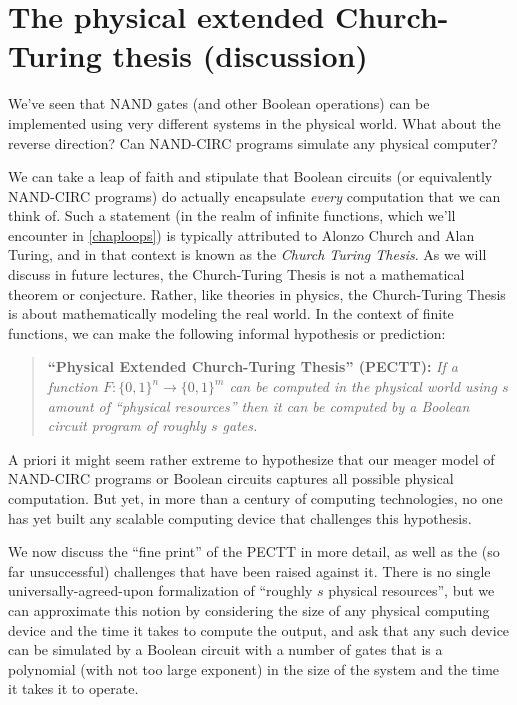 \section{The physical extended Church-Turing thesis
(discussion)}\label{PECTTsec}

We've seen that NAND gates (and other Boolean operations) can be
implemented using very different systems in the physical world. What
about the reverse direction? Can NAND-CIRC programs simulate any
physical computer?

We can take a leap of faith and stipulate that Boolean circuits (or
equivalently NAND-CIRC programs) do actually encapsulate \emph{every}
computation that we can think of. Such a statement (in the realm of
infinite functions, which we'll encounter in \cref{chaploops}) is
typically attributed to Alonzo Church and Alan Turing, and in that
context is known as the \emph{Church Turing Thesis}. As we will discuss
in future lectures, the Church-Turing Thesis is not a mathematical
theorem or conjecture. Rather, like theories in physics, the
Church-Turing Thesis is about mathematically modeling the real world. In
the context of finite functions, we can make the following informal
hypothesis or prediction:

\begin{quote}
\textbf{``Physical Extended Church-Turing Thesis'' (PECTT):} \emph{If a
function \(F:\{0,1\}^n \rightarrow \{0,1\}^m\) can be computed in the
physical world using \(s\) amount of ``physical resources'' then it can
be computed by a Boolean circuit program of roughly \(s\) gates.}
\end{quote}

A priori it might seem rather extreme to hypothesize that our meager
model of NAND-CIRC programs or Boolean circuits captures all possible
physical computation. But yet, in more than a century of computing
technologies, no one has yet built any scalable computing device that
challenges this hypothesis.

We now discuss the ``fine print'' of the PECTT in more detail, as well
as the (so far unsuccessful) challenges that have been raised against
it. There is no single universally-agreed-upon formalization of
``roughly \(s\) physical resources'', but we can approximate this notion
by considering the size of any physical computing device and the time it
takes to compute the output, and ask that any such device can be
simulated by a Boolean circuit with a number of gates that is a
polynomial (with not too large exponent) in the size of the system and
the time it takes it to operate.

